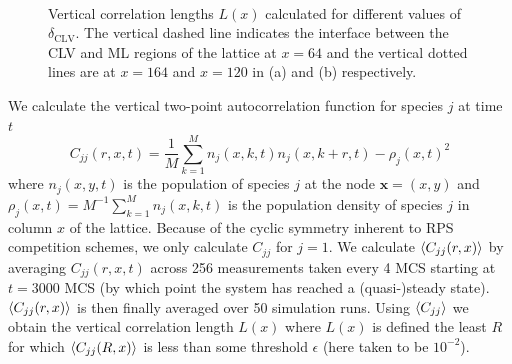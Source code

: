\documentclass[12pt]{article}
\begin{document}
\begin{figure}[!h]
    \begin{center}
    \\
    \caption{Vertical correlation lengths $ L(x) $ calculated for different values of $ \delta_{\mathrm{CLV}} $.
    The vertical dashed line indicates the interface between the CLV and ML regions of the lattice at $ x = 64 $ and the vertical 
    dotted lines are at $ x=164 $ and $ x = 120 $ in (a) and (b) respectively.  }
    \label{fig:corr_lens}
    \end{center} 
\end{figure}

We calculate the vertical two-point autocorrelation function for species $ j $ at time $ t $ 
\begin{equation}
    C_{jj}(r,x,t) = \frac{1}{M} \sum^{M}_{k=1} n_j(x, k, t)n_j(x, k+r, t) - \rho_j(x,t)^2
\end{equation}
where $ n_j(x,y,t) $ is the population of species $ j $ at the node $ \bm{x} = (x,y) $ and
$ \rho_j(x,t) = M^{-1} \sum_{k=1}^{M} n_j(x,k,t) $ is the population density of species $ j $
in column $ x $ of the lattice. Because of the cyclic symmetry inherent to RPS competition schemes,
we only calculate $ C_{jj} $ for $ j=1 $. We calculate $ \braket{C_{jj}(r,x)} $ by averaging $ C_{jj}(r,x,t) $ across 256 measurements 
taken every 4 MCS starting at $ t=3000  $ MCS (by which point the system has reached a (quasi-)steady state). 
$ \braket{C_{jj}(r,x)} $ is then finally averaged over 50 simulation runs. Using $ \braket{C_{jj}} $ we obtain
the vertical correlation length $ L(x) $ where $ L(x) $ is defined the least $ R $ for which 
$ \braket{C_{jj}(R,x)} $ is less than some threshold $ \epsilon $ (here taken to be $ 10^{-2} $). 
\end{document}

